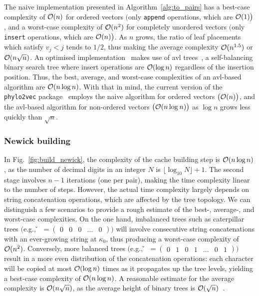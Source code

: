 The naive implementation presented in Algorithm~\ref{alg:to_pairs} has a best-case complexity of $\mathcal{O}(n)$ for ordered vectors $\big($only \texttt{append} operations, which are $\mathcal{O}(1)\big)$, and a worst-case complexity of $\mathcal{O}(n^2)$ for completely unordered vectors $\big($only \texttt{insert} operations, which are $\mathcal{O}(n)\big)$. As $n$ grows, the ratio of leaf placements which satisfy $v_j < j$ tends to $1/2$, thus making the average complexity $\mathcal{O}(n^{1.5})$ or $\mathcal{O}(n\sqrt{n})$. An optimised implementation~\cite{scheidwasser2025} makes use of \gls{avl} trees~\cite{adelson1962}, a self-balancing binary search tree where insert operations are $\mathcal{O}(\log n)$ regardless of the insertion position. Thus, the best, average, and worst-case complexities of an \gls{avl}-based algorithm are $\mathcal{O}(n \log n)$. With that in mind, the current version of the \texttt{phylo2vec} package~\cite{scheidwasser2025} employs the naive algorithm for ordered vectors $\big(\mathcal{O}(n)\big)$, and the \gls{avl}-based algorithm for non-ordered vectors $\big(\mathcal{O}(n\log n)\big)$ as $\log n$ grows less quickly than $\sqrt n$.

\subsubsection{Newick building}

In Fig.~\ref{fig:build_newick}, the complexity of the cache building step is $\mathcal{O}(n \log n)$, as the number of decimal digits in an integer $N$ is $\lfloor\log_{10} N\rfloor+1$. The second stage involves $n-1$ iterations (one per pair), making the time complexity linear to the number of steps. However, the actual time complexity largely depends on string concatenation operations, which are affected by the tree topology. We can distinguish a few scenarios to provide a rough estimate of the best-, average-, and worst-case complexities. On the one hand, imbalanced trees such as caterpillar trees $\big($e.g., \v~$= \begin{pmatrix} 0 & 0 & 0 & ... & 0\end{pmatrix}\big)$ will involve consecutive string concatenations with an ever-growing string at $\kappa_0$, thus producing a worst-case complexity of $\mathcal{O}(n^2)$. Conversely, more balanced trees $\big($e.g., \v~$= \begin{pmatrix} 0 & 1 & 0 & 1 & ... & 0 & 1\end{pmatrix}\big)$ result in a more even distribution of the concatenation operations: each character will be copied at most $\mathcal{O}(\log n)$ times as it propagates up the tree levels, yielding a best-case complexity of $\mathcal{O}(n \log n)$. A reasonable estimate for the average complexity is $\mathcal{O}(n \sqrt n)$, as the average height of binary trees is $\mathcal{O}(\sqrt n)$~\cite{flajolet1982}.

